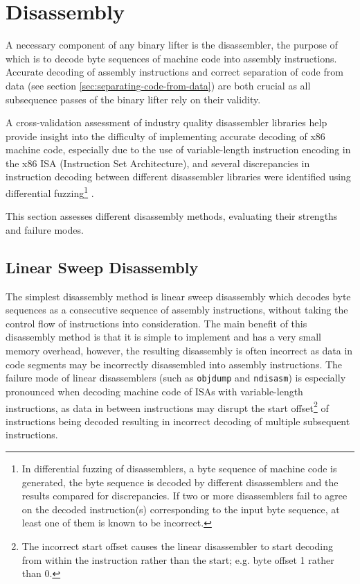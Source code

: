 

\section{Disassembly}

A necessary component of any binary lifter is the disassembler, the purpose of which is to decode byte sequences of machine code into assembly instructions. Accurate decoding of assembly instructions and correct separation of code from data (see section \ref{sec:separating-code-from-data}) are both crucial as all subsequence passes of the binary lifter rely on their validity.

A cross-validation assessment of industry quality disassembler libraries help provide insight into the difficulty of implementing accurate decoding of x86 machine code, especially due to the use of variable-length instruction encoding in the x86 ISA (Instruction Set Architecture), and several discrepancies in instruction decoding between different disassembler libraries were identified using differential fuzzing\footnote{In differential fuzzing of disassemblers, a byte sequence of machine code is generated, the byte sequence is decoded by different disassemblers and the results compared for discrepancies. If two or more disassemblers fail to agree on the decoded instruction(s) corresponding to the input byte sequence, at least one of them is known to be incorrect.} \cite{broken_x86_disassemblers}.

This section assesses different disassembly methods, evaluating their strengths and failure modes.


\subsection{Linear Sweep Disassembly}

The simplest disassembly method is linear sweep disassembly which decodes byte sequences as a consecutive sequence of assembly instructions, without taking the control flow of instructions into consideration. The main benefit of this disassembly method is that it is simple to implement and has a very small memory overhead, however, the resulting disassembly is often incorrect as data in code segments may be incorrectly disassembled into assembly instructions. The failure mode of linear disassemblers (such as \texttt{objdump} and \texttt{ndisasm}) is especially pronounced when decoding machine code of ISAs with variable-length instructions, as data in between instructions may disrupt the start offset\footnote{The incorrect start offset causes the linear disassembler to start decoding from within the instruction rather than the start; e.g. byte offset 1 rather than 0.} of instructions being decoded resulting in incorrect decoding of multiple subsequent instructions.

